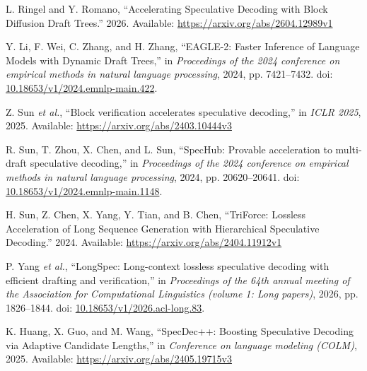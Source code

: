 \documentclass[11pt,a4paper,UTF8,fontset=none,scheme=plain,zihao=-4]{ctexart}
\newenvironment{CSLReferences}[2]{%
  \footnotesize
  \raggedright
  \setlength{\leftskip}{3em}%
  \setlength{\parindent}{-3em}%
  \setlength{\parskip}{0.1\baselineskip}%
  \sloppy
}{}
\newcommand{\CSLLeftMargin}[1]{\makebox[3em][l]{#1}}
\newcommand{\CSLRightInline}[1]{#1}
\begin{document}
\begin{CSLReferences}{0}{0}
\leavevmode{}%
\CSLLeftMargin{{[}37{]} }
\CSLRightInline{L. Ringel and Y. Romano, {``{Accelerating Speculative
Decoding with Block Diffusion Draft Trees}.''} 2026. Available:
\url{https://arxiv.org/abs/2604.12989v1}}

\leavevmode{}%
\CSLLeftMargin{{[}38{]} }
\CSLRightInline{Y. Li, F. Wei, C. Zhang, and H. Zhang, {``{EAGLE-2:
Faster Inference of Language Models with Dynamic Draft Trees},''} in
\emph{Proceedings of the 2024 conference on empirical methods in natural
language processing}, 2024, pp. 7421--7432. doi:
\href{https://doi.org/10.18653/v1/2024.emnlp-main.422}{10.18653/v1/2024.emnlp-main.422}.}

\leavevmode{}%
\CSLLeftMargin{{[}39{]} }
\CSLRightInline{Z. Sun \emph{et al.}, {``Block verification accelerates
speculative decoding,''} in \emph{ICLR 2025}, 2025. Available:
\url{https://arxiv.org/abs/2403.10444v3}}

\leavevmode{}%
\CSLLeftMargin{{[}40{]} }
\CSLRightInline{R. Sun, T. Zhou, X. Chen, and L. Sun, {``SpecHub:
Provable acceleration to multi-draft speculative decoding,''} in
\emph{Proceedings of the 2024 conference on empirical methods in natural
language processing}, 2024, pp. 20620--20641. doi:
\href{https://doi.org/10.18653/v1/2024.emnlp-main.1148}{10.18653/v1/2024.emnlp-main.1148}.}

\leavevmode{}%
\CSLLeftMargin{{[}41{]} }
\CSLRightInline{H. Sun, Z. Chen, X. Yang, Y. Tian, and B. Chen,
{``{TriForce: Lossless Acceleration of Long Sequence Generation with
Hierarchical Speculative Decoding}.''} 2024. Available:
\url{https://arxiv.org/abs/2404.11912v1}}

\leavevmode{}%
\CSLLeftMargin{{[}42{]} }
\CSLRightInline{P. Yang \emph{et al.}, {``{LongSpec}: Long-context
lossless speculative decoding with efficient drafting and
verification,''} in \emph{Proceedings of the 64th annual meeting of the
{A}ssociation for {C}omputational {L}inguistics (volume 1: Long
papers)}, 2026, pp. 1826--1844. doi:
\href{https://doi.org/10.18653/v1/2026.acl-long.83}{10.18653/v1/2026.acl-long.83}.}

\leavevmode{}%
\CSLLeftMargin{{[}43{]} }
\CSLRightInline{K. Huang, X. Guo, and M. Wang, {``{SpecDec++: Boosting
Speculative Decoding via Adaptive Candidate Lengths},''} in
\emph{Conference on language modeling (COLM)}, 2025. Available:
\url{https://arxiv.org/abs/2405.19715v3}}


\end{CSLReferences}
\end{document}
